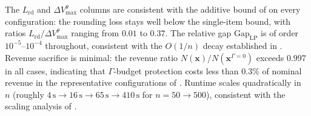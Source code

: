 \documentclass[11pt, a4paper]{article}
\theoremstyle{plain}
\theoremstyle{definition}
\theoremstyle{remark}
\begin{document}
The $L_{\mathrm{rd}}$ and $\Delta V_{\max}^\theta$ columns are consistent with the additive bound of
 on every configuration: the rounding loss stays well
below the single-item bound, with ratios
$L_{\mathrm{rd}}/\Delta V_{\max}^\theta$ ranging from $0.01$ to $0.37$.
The relative gap $\mathrm{Gap}_{\mathrm{LP}}$ is of order $10^{-5}$--$10^{-4}$ throughout,
consistent with the \(O(1/n)\) decay established in .
Revenue sacrifice is minimal: the revenue ratio
$N(\bm x)/N(\bm x^{\Gamma=0})$ exceeds $0.997$ in all cases, indicating that
$\Gamma$-budget protection costs less than $0.3\%$ of nominal revenue in the representative configurations of .
Runtime scales quadratically in~$n$ (roughly $4\,\text{s}\to 16\,\text{s}\to 65\,\text{s}
\to 410\,\text{s}$ for $n=50\to 500$), consistent with the scaling analysis of
.
\end{document}
